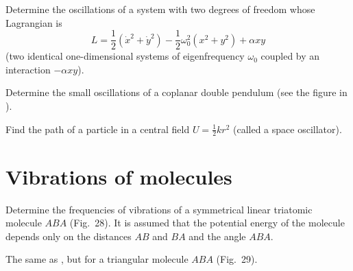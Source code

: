 
\begin{problem}[title={Two identical coupled oscillators}]
{
Determine the oscillations of a system with two degrees of freedom whose Lagrangian is
\begin{equation*}
    L = \frac{1}{2}\left(\Dot{x}^2 + \Dot{y}^2\right) - \frac{1}{2}\omega_0^2\left(x^2 + y^2\right) + \alpha x y
\end{equation*}
(two identical one-dimensional systems of eigenfrequency $\omega_0$ coupled by an interaction $-\alpha x y$).
}
{}
{}
\end{problem}


\begin{problem}[title={Oscillations of a coplanar double pendulum}]
{
Determine the small oscillations of a coplanar double pendulum (see the figure in ).
}
{}
{}
\end{problem}


\begin{problem}[title={Path of a space oscillator}]
{
Find the path of a particle in a central field $U = \frac{1}{2} k r^2$ (called a space oscillator).
}
{}
{}
\end{problem}

\section{Vibrations of molecules}


\begin{problem}[title={Symmetric linear triatomic molecule modes}]
{
Determine the frequencies of vibrations of a symmetrical linear triatomic molecule $ABA$ (Fig.~28). It is assumed that the potential energy of the molecule depends only on the distances $AB$ and $BA$ and the angle $ABA$.
}
{}
{}
\end{problem}


\begin{problem}[title={Vibrations of a triangular triatomic molecule}]
{
The same as , but for a triangular molecule $ABA$ (Fig.~29).
}
{}
{}
\end{problem}

